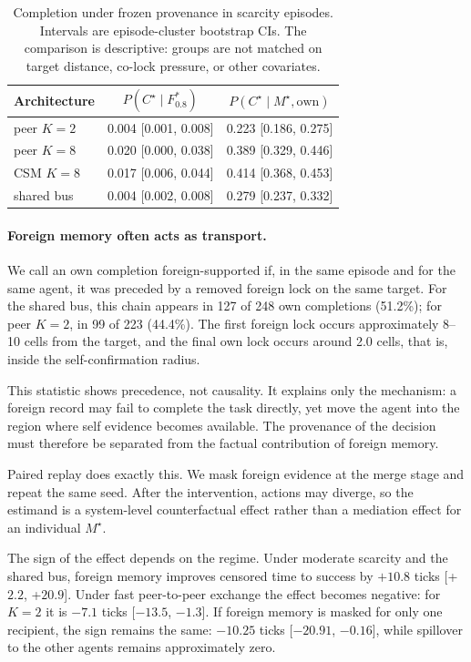 \documentclass{article}
\newcommand{\mstar}{M^{\star}}
\newcommand{\cstar}{C^{\star}}
\begin{document}
\begin{table}[t]
\caption{Completion under frozen provenance in scarcity episodes. Intervals are episode-cluster bootstrap CIs. The comparison is descriptive: groups are not matched on target distance, co-lock pressure, or other covariates.}
\label{tab:provenance}
\centering
\small
\begin{tabular}{lcc}
\toprule
Architecture & $P(\cstar\mid F^*_{0.8})$ & $P(\cstar\mid \mstar,\mathrm{own})$ \\
\midrule
peer $K=2$ & 0.004 [0.001, 0.008] & 0.223 [0.186, 0.275] \\
peer $K=8$ & 0.020 [0.000, 0.038] & 0.389 [0.329, 0.446] \\
CSM $K=8$ & 0.017 [0.006, 0.044] & 0.414 [0.368, 0.453] \\
shared bus & 0.004 [0.002, 0.008] & 0.279 [0.237, 0.332] \\
\bottomrule
\end{tabular}
\end{table}

\paragraph{Foreign memory often acts as transport.}
We call an own completion foreign-supported if, in the same episode and for the same agent, it was preceded by a removed foreign lock on the same target. For the shared bus, this chain appears in 127 of 248 own completions (51.2\%); for peer $K=2$, in 99 of 223 (44.4\%). The first foreign lock occurs approximately 8--10 cells from the target, and the final own lock occurs around 2.0 cells, that is, inside the self-confirmation radius.

This statistic shows precedence, not causality. It explains only the mechanism: a foreign record may fail to complete the task directly, yet move the agent into the region where self evidence becomes available. The provenance of the decision must therefore be separated from the factual contribution of foreign memory.

Paired replay does exactly this. We mask foreign evidence at the merge stage and repeat the same seed. After the intervention, actions may diverge, so the estimand is a system-level counterfactual effect rather than a mediation effect for an individual $\mstar$.

The sign of the effect depends on the regime. Under moderate scarcity and the shared bus, foreign memory improves censored time to success by $+10.8$ ticks [+$2.2$, +$20.9$]. Under fast peer-to-peer exchange the effect becomes negative: for $K=2$ it is $-7.1$ ticks [$-13.5$, $-1.3$]. If foreign memory is masked for only one recipient, the sign remains the same: $-10.25$ ticks [$-20.91$, $-0.16$], while spillover to the other agents remains approximately zero.
\end{document}

